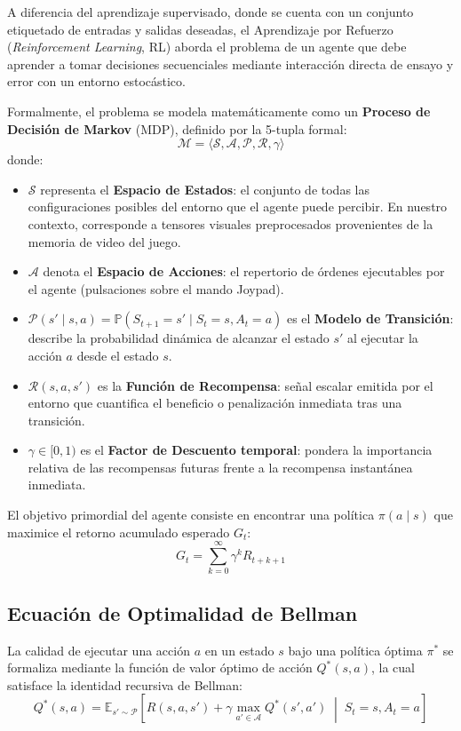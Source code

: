 \documentclass[11pt,letterpaper]{article}
\begin{document}
A diferencia del aprendizaje supervisado, donde se cuenta con un conjunto etiquetado de entradas y salidas deseadas, el Aprendizaje por Refuerzo (\textit{Reinforcement Learning}, RL) aborda el problema de un agente que debe aprender a tomar decisiones secuenciales mediante interacción directa de ensayo y error con un entorno estocástico.

Formalmente, el problema se modela matemáticamente como un \textbf{Proceso de Decisión de Markov} (MDP), definido por la 5-tupla formal:
\begin{equation}
    \mathcal{M} = \langle \mathcal{S}, \mathcal{A}, \mathcal{P}, \mathcal{R}, \gamma \rangle
\end{equation}
donde:
\begin{itemize}
    \item $\mathcal{S}$ representa el \textbf{Espacio de Estados}: el conjunto de todas las configuraciones posibles del entorno que el agente puede percibir. En nuestro contexto, corresponde a tensores visuales preprocesados provenientes de la memoria de video del juego.
    \item $\mathcal{A}$ denota el \textbf{Espacio de Acciones}: el repertorio de órdenes ejecutables por el agente (pulsaciones sobre el mando Joypad).
    \item $\mathcal{P}(s' \mid s, a) = \mathbb{P}(S_{t+1} = s' \mid S_t = s, A_t = a)$ es el \textbf{Modelo de Transición}: describe la probabilidad dinámica de alcanzar el estado $s'$ al ejecutar la acción $a$ desde el estado $s$.
    \item $\mathcal{R}(s, a, s')$ es la \textbf{Función de Recompensa}: señal escalar emitida por el entorno que cuantifica el beneficio o penalización inmediata tras una transición.
    \item $\gamma \in [0, 1)$ es el \textbf{Factor de Descuento temporal}: pondera la importancia relativa de las recompensas futuras frente a la recompensa instantánea inmediata.
\end{itemize}

El objetivo primordial del agente consiste en encontrar una política $\pi(a \mid s)$ que maximice el retorno acumulado esperado $G_t$:
\begin{equation}
    G_t = \sum_{k=0}^{\infty} \gamma^k R_{t+k+1}
\end{equation}

\subsection{Ecuación de Optimalidad de Bellman}
La calidad de ejecutar una acción $a$ en un estado $s$ bajo una política óptima $\pi^*$ se formaliza mediante la función de valor óptimo de acción $Q^*(s, a)$, la cual satisface la identidad recursiva de Bellman:
\begin{equation}
    Q^*(s, a) = \mathbb{E}_{s' \sim \mathcal{P}} \left[ R(s, a, s') + \gamma \max_{a' \in \mathcal{A}} Q^*(s', a') \;\middle|\; S_t = s, A_t = a \right]
\end{equation}
\end{document}
